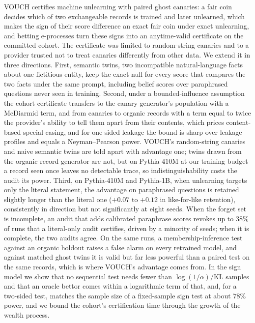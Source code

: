 VOUCH certifies machine unlearning with paired ghost canaries: a fair coin decides which
of two exchangeable records is trained and later unlearned, which makes the sign of their
score difference an exact fair coin under exact unlearning, and betting e-processes turn
these signs into an anytime-valid certificate on the committed cohort. The certificate
was limited to random-string canaries and to a provider trusted not to treat canaries
differently from other data. We extend it in three directions. First, semantic twins, two
incompatible natural-language facts about one fictitious entity, keep the exact null for
every score that compares the two facts under the same prompt, including belief scores
over paraphrased questions never seen in training. Second, under a bounded-influence
assumption the cohort certificate transfers to the canary generator's population with a
McDiarmid term, and from canaries to organic records with a term equal to twice the
provider's ability to tell them apart from their contents, which prices content-based
special-casing, and for one-sided leakage the bound is sharp over leakage profiles and
equals a Neyman--Pearson power. VOUCH's random-string canaries and naive semantic twins are told apart with
advantage one; twins drawn from the organic record generator are not, but on Pythia-410M at our
training budget a record seen once leaves no detectable trace, so indistinguishability
costs the audit its power. Third, on Pythia-410M and Pythia-1B, when unlearning targets only the literal
statement, the advantage on paraphrased questions is retained slightly longer than the
literal one ($+0.07$ to $+0.12$ in like-for-like retention), consistently in direction
but not significantly at eight seeds. When the forget set is incomplete, an audit that
adds calibrated paraphrase scores revokes up to $38\%$ of runs that a literal-only audit
certifies, driven by a minority of seeds; when it is complete, the two audits agree. On the same runs, a
membership-inference test against an organic holdout raises a false alarm on every
retrained model, and against matched ghost twins it is valid but far less powerful than a paired test on
the same records, which is where VOUCH's advantage comes from. In the sign model we show that
no sequential test needs fewer than $\log(1/\alpha)/\mathrm{KL}$ samples and that an oracle
bettor comes within a logarithmic term of that, and, for a two-sided test, matches the
sample size of a fixed-sample sign test at about $78\%$ power, and we bound the cohort's certification time through the growth of the wealth
process.
